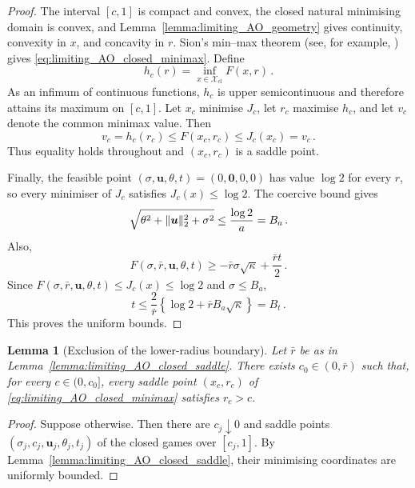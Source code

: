\documentclass{article}
\makeatletter
\newtheorem{lemma}{Lemma}
\theoremstyle{definition}
\newcommand{\vnorm}[1]{%
	\ensuremath{%
		\if@display
		\left\| #1 \right\|
		\else
		\| #1 \|
		\fi
	}%
}
\newcommand*{\bb}{\boldsymbol}
\def\bu{\bb{u}}
\makeatother
\begin{document}
\begin{bibunit}
\begin{proof}
The interval $[c,1]$ is compact and convex, the closed natural minimising
domain is convex, and Lemma~\ref{lemma:limiting_AO_geometry} gives
continuity, convexity in $x$, and concavity in $r$. Sion's min--max theorem
(see, for example, \citealt[][Theorem~3]{simons:1995}) gives
\eqref{eq:limiting_AO_closed_minimax}. Define
$$
    h_c(r)
    =
    \underset{x\in\mathcal X_{\mathrm{cl}}}{\inf}F(x,r)\,.
$$
As an infimum of continuous functions, $h_c$ is upper semicontinuous and
therefore attains its maximum on $[c,1]$. Let $x_c$ minimise $J_c$, let
$r_c$ maximise $h_c$, and let $v_c$ denote the common minimax value. Then
$$
    v_c=h_c(r_c)
    \leq F(x_c,r_c)
    \leq J_c(x_c)=v_c\,.
$$
Thus equality holds throughout and $(x_c,r_c)$ is a saddle point.

Finally, the feasible point $(\sigma,\bu,\theta,t)=(0,\bb0,0,0)$ has
value $\log2$ for every $r$, so every minimiser of $J_c$ satisfies
$J_c(x)\leq\log2$. The coercive bound gives
$$
    \sqrt{\theta^2+\vnorm{\bu}_2^2+\sigma^2}
    \leq
    \frac{\log2}{a}
    =B_a\,.
$$
Also,
$$
    F(\sigma,\bar r,\bu,\theta,t)
    \geq
    -\bar r\sigma\sqrt\kappa+\frac{\bar r t}{2}\,.
$$
Since $F(\sigma,\bar r,\bu,\theta,t)\leq J_c(x)\leq\log2$ and
$\sigma\leq B_a$,
$$
    t
    \leq
    \frac{2}{\bar r}
    \left\{
        \log2+\bar rB_a\sqrt\kappa
    \right\}
    =B_t\,.
$$
This proves the uniform bounds.
\end{proof}

\begin{lemma}[Exclusion of the lower-radius boundary]
\label{lemma:limiting_AO_lower_radius}
Let $\bar r$ be as in
Lemma~\ref{lemma:limiting_AO_closed_saddle}. There exists
$c_0\in(0,\bar r)$ such that, for every $c\in(0,c_0]$, every saddle point
$(x_c,r_c)$ of \eqref{eq:limiting_AO_closed_minimax} satisfies $r_c>c$.
\end{lemma}

\begin{proof}
Suppose otherwise. Then there are $c_j\downarrow0$ and saddle points
$(\sigma_j,c_j,\bu_j,\theta_j,t_j)$ of the closed games over $[c_j,1]$.
By Lemma~\ref{lemma:limiting_AO_closed_saddle}, their minimising
coordinates are uniformly bounded.


\end{proof}
\end{bibunit}
\end{document}
